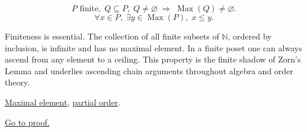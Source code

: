 \begin{remark*}
\[
P \text{ finite},\; Q \subseteq P,\; Q \neq \varnothing
\;\Longrightarrow\;
\operatorname{Max}(Q) \neq \varnothing.
\]
\[
\forall x \in P,\; \exists y \in \operatorname{Max}(P),\; x \leq y.
\]
\end{remark*}

\begin{remark*}[Interpretation]
Finiteness is essential.  The collection of all finite subsets of
$\mathbb{N}$, ordered by inclusion, is infinite and has no maximal
element.  In a finite poset one can always ascend from any element to
a ceiling.  This property is the finite shadow of Zorn's Lemma and
underlies ascending chain arguments throughout algebra and order theory.
\end{remark*}

\begin{remark*}[Dependencies]
\hyperref[def:maximal-element]{Maximal element},
\hyperref[def:lattice-order-partial-order]{partial order}.
\end{remark*}

\begin{remark*}[Proof]
\hyperref[prf:finite-poset-maximal]{Go to proof.}
\end{remark*}
